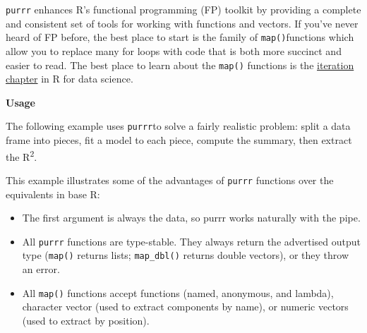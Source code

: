 \documentclass[
]{article}
\newenvironment{Shaded}{}{}
\newcommand{\AttributeTok}[1]{\textcolor[rgb]{0.49,0.56,0.16}{#1}}
\newcommand{\CommentTok}[1]{\textcolor[rgb]{0.38,0.63,0.69}{\textit{#1}}}
\newcommand{\FunctionTok}[1]{\textcolor[rgb]{0.02,0.16,0.49}{#1}}
\newcommand{\NormalTok}[1]{#1}
\newcommand{\SpecialCharTok}[1]{\textcolor[rgb]{0.25,0.44,0.63}{#1}}
\newcommand{\StringTok}[1]{\textcolor[rgb]{0.25,0.44,0.63}{#1}}
\begin{document}
\texttt{purrr} enhances R's functional programming (FP) toolkit by
providing a complete and consistent set of tools for working with
functions and vectors. If you've never heard of FP before, the best
place to start is the family of \texttt{map()}functions which allow you
to replace many for loops with code that is both more succinct and
easier to read. The best place to learn about the \texttt{map()}
functions is the \href{https://r4ds.had.co.nz/iteration.html}{iteration
chapter} in R for data science.

\textbf{Usage}

The following example uses \texttt{purrr}to solve a fairly realistic
problem: split a data frame into pieces, fit a model to each piece,
compute the summary, then extract the R\textsuperscript{2}.

\begin{Shaded}
\end{Shaded}

This example illustrates some of the advantages of \texttt{purrr}
functions over the equivalents in base R:

\begin{itemize}
\item
  The first argument is always the data, so purrr works naturally with
  the pipe.
\item
  All \texttt{purrr} functions are type-stable. They always return the
  advertised output type (\texttt{map()} returns lists;
  \texttt{map\_dbl()} returns double vectors), or they throw an error.
\item
  All \texttt{map()} functions accept functions (named, anonymous, and
  lambda), character vector (used to extract components by name), or
  numeric vectors (used to extract by position).
\end{itemize}
\end{document}
